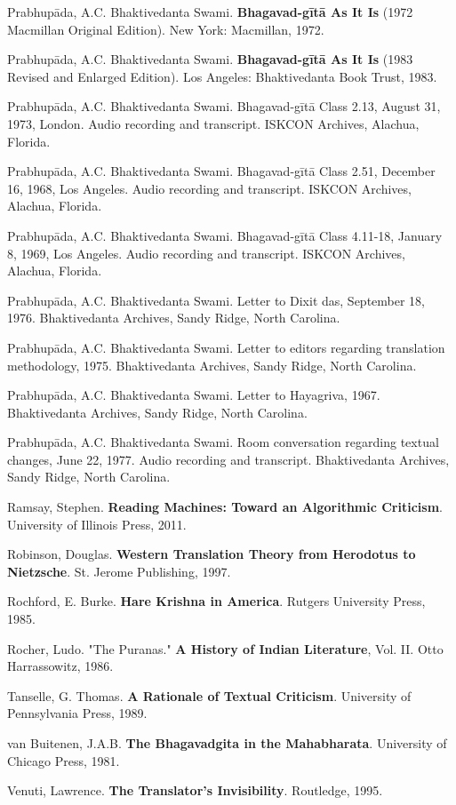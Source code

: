 \documentclass[11pt,twoside]{book}
\begin{document}
Prabhupāda, A.C. Bhaktivedanta Swami. \textbf{Bhagavad-gītā As It Is} (1972 Macmillan Original Edition). New York: Macmillan, 1972.

Prabhupāda, A.C. Bhaktivedanta Swami. \textbf{Bhagavad-gītā As It Is} (1983 Revised and Enlarged Edition). Los Angeles: Bhaktivedanta Book Trust, 1983.

Prabhupāda, A.C. Bhaktivedanta Swami. Bhagavad-gītā Class 2.13, August 31, 1973, London. Audio recording and transcript. ISKCON Archives, Alachua, Florida.

Prabhupāda, A.C. Bhaktivedanta Swami. Bhagavad-gītā Class 2.51, December 16, 1968, Los Angeles. Audio recording and transcript. ISKCON Archives, Alachua, Florida.

Prabhupāda, A.C. Bhaktivedanta Swami. Bhagavad-gītā Class 4.11-18, January 8, 1969, Los Angeles. Audio recording and transcript. ISKCON Archives, Alachua, Florida.

Prabhupāda, A.C. Bhaktivedanta Swami. Letter to Dixit das, September 18, 1976. Bhaktivedanta Archives, Sandy Ridge, North Carolina.

Prabhupāda, A.C. Bhaktivedanta Swami. Letter to editors regarding translation methodology, 1975. Bhaktivedanta Archives, Sandy Ridge, North Carolina.

Prabhupāda, A.C. Bhaktivedanta Swami. Letter to Hayagriva, 1967. Bhaktivedanta Archives, Sandy Ridge, North Carolina.

Prabhupāda, A.C. Bhaktivedanta Swami. Room conversation regarding textual changes, June 22, 1977. Audio recording and transcript. Bhaktivedanta Archives, Sandy Ridge, North Carolina.

Ramsay, Stephen. \textbf{Reading Machines: Toward an Algorithmic Criticism}. University of Illinois Press, 2011.

Robinson, Douglas. \textbf{Western Translation Theory from Herodotus to Nietzsche}. St. Jerome Publishing, 1997.

Rochford, E. Burke. \textbf{Hare Krishna in America}. Rutgers University Press, 1985.

Rocher, Ludo. "The Puranas." \textbf{A History of Indian Literature}, Vol. II. Otto Harrassowitz, 1986.

Tanselle, G. Thomas. \textbf{A Rationale of Textual Criticism}. University of Pennsylvania Press, 1989.

van Buitenen, J.A.B. \textbf{The Bhagavadgita in the Mahabharata}. University of Chicago Press, 1981.

Venuti, Lawrence. \textbf{The Translator's Invisibility}. Routledge, 1995.
\end{document}
